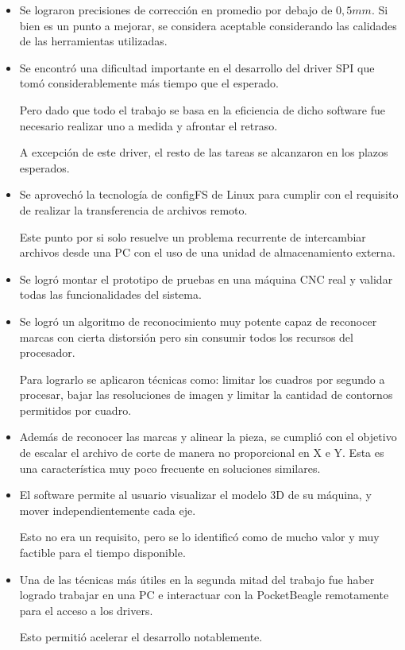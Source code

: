 \begin{itemize}
   \item{Se lograron precisiones de corrección en promedio por debajo de $0,5mm$. Si bien es un punto a mejorar, se considera aceptable considerando las calidades de las herramientas utilizadas.}

   \item{Se encontró una dificultad importante en el desarrollo del driver SPI que tomó considerablemente más tiempo que el esperado. \par
      Pero dado que todo el trabajo se basa en la eficiencia de dicho software fue necesario realizar uno a medida y afrontar el retraso.\par
   A excepción de este driver, el resto de las tareas se alcanzaron en los plazos esperados.}
   
   \item{Se aprovechó la tecnología de configFS de Linux para cumplir con el requisito de realizar la transferencia de archivos remoto.\par
      Este punto por si solo resuelve un problema recurrente de intercambiar archivos desde una PC con el uso de una unidad de almacenamiento externa.}

   \item{Se logró montar el prototipo de pruebas en una máquina CNC real y validar todas las funcionalidades del sistema.}

   \item{Se logró un algoritmo de reconocimiento muy potente capaz de reconocer marcas con cierta distorsión pero sin consumir todos los recursos del procesador. \par
      Para lograrlo se aplicaron técnicas como: limitar los cuadros por segundo a procesar, bajar las resoluciones de imagen y limitar la cantidad de contornos permitidos por cuadro.}

   \item{Además de reconocer las marcas y alinear la pieza, se cumplió con el objetivo de escalar el archivo de corte de manera no proporcional en X e Y. Esta es una característica muy poco frecuente en soluciones similares.}

   \item{El software permite al usuario visualizar el modelo 3D de su máquina, y mover independientemente cada eje.\par
      Esto no era un requisito, pero se lo identificó como de mucho valor y muy factible para el tiempo disponible.}

   \item{Una de las técnicas más útiles en la segunda mitad del trabajo fue haber logrado trabajar en una PC e interactuar con la PocketBeagle remotamente para el acceso a los drivers.\par Esto permitió acelerar el desarrollo notablemente.}

\end{itemize}


